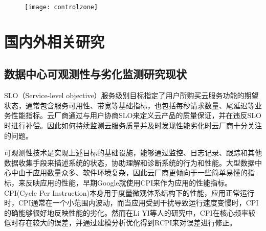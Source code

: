 \begin{figure}[!htbp]
    \centering
    \texttt{[image: controlzone]}
    \label{fig:controlzone}
\end{figure}


\section{国内外相关研究}


\subsection{数据中心可观测性与劣化监测研究现状}


SLO（Service-level objective）服务级别目标指定了用户所购买云服务功能的期望状态，通常包含服务可用性、带宽等基础指标，也包括每秒请求数量、尾延迟等业务性能指标。云厂商通过与用户协商SLO来定义云产品的质量保证，并在违反SLO时进行补偿。因此如何持续监测云服务质量并及时发现性能劣化时云厂商十分关注的问题。

可观测性技术是实现上述目标的基础设施，能够通过监控、日志记录、跟踪和其他数据收集手段来描述系统的状态，协助理解和诊断系统的行为和性能。大型数据中心中由于应用数量众多、软件环境复杂，因此云厂商更倾向于一些简单易懂的指标，来反映应用的性能，早期Google就使用CPI来作为应用的性能指标\citep{zhang2013cpi2}。CPI(Cycle Per Instruction)本身用于度量微观体系结构下的性能，应用正常运行时，CPI通常在一个小范围内波动，而当应用受到干扰导致运行速度变慢时，CPI的确能够很好地反映性能的劣化。然而在Li YI等人的研究中\citep{yi2020cpi}，CPI在核心频率较低时存在较大的误差，并通过建模分析优化得到RCPI来对误差进行修正。

